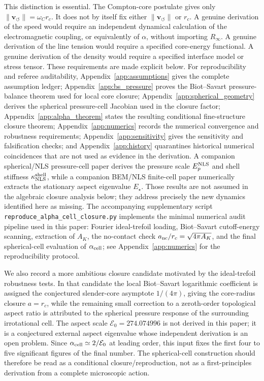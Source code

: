 \documentclass[aps,pra,preprint,longbibliography,nofootinbib]{revtex4-2}
\newcommand{\Et}{\mathcal{E}_0}                    %
\begin{document}
This distinction is essential.  The Compton-core postulate gives only
$\lVert \mathbf{v}_{\!\boldsymbol{\circlearrowleft}}\rVert=\omega_C r_c$.
It does not by itself fix either
$\lVert \mathbf{v}_{\!\boldsymbol{\circlearrowleft}}\rVert$ or $r_c$.
A genuine derivation of the speed would require an independent dynamical
calculation of the electromagnetic coupling, or equivalently of
$\alpha$, without importing $R_\infty$.  A genuine derivation of the line
tension would require a specified core-energy functional.  A genuine
derivation of the density would require a specified interface model or
stress tensor.  These requirements are made explicit below.  For reproducibility and
referee auditability, Appendix~\ref{app:assumptions} gives the complete
assumption ledger; Appendix~\ref{app:bs_pressure} proves the Biot--Savart
pressure-balance theorem used for local core closure;
Appendix~\ref{app:spherical_geometry} derives the spherical pressure-cell
Jacobian used in the closure factor; Appendix~\ref{app:alpha_theorem}
states the resulting conditional fine-structure closure theorem;
Appendix~\ref{app:numerics} records the numerical convergence and
robustness requirements; Appendix~\ref{app:sensitivity} gives the
sensitivity and falsification checks; and Appendix~\ref{app:history}
quarantines historical numerical coincidences that are not used as
evidence in the derivation.  A companion spherical/NLS pressure-cell paper
derives the pressure scale \(E_p^{\rm NLS}\) and shell stiffness
\(\kappa_{\rm NLS}^{\rm shell}\), while a companion BEM/NLS finite-cell
paper numerically extracts the stationary aspect eigenvalue \(E_\star\).
Those results are not assumed in the algebraic closure analysis below; they
address precisely the new dynamics identified here as missing.  The accompanying
supplementary script
\texttt{reproduce\_alpha\_cell\_closure.py} implements the minimal numerical
audit pipeline used in this paper: Fourier ideal-trefoil loading,
Biot--Savart cutoff-energy scanning, extraction of $A_K$, the
no-contact check $a_{\rm nc}/r_c=\sqrt{4\pi A_K}$, and the final
spherical-cell evaluation of $\alpha_{\rm cell}$; see
Appendix~\ref{app:numerics} for the reproducibility protocol.


We also record a more ambitious closure candidate motivated by the
ideal-trefoil robustness tests.  In that candidate the local Biot--Savart
logarithmic coefficient is assigned the conjectured slender-core asymptote
$1/(4\pi)$, giving the core-radius closure $a=r_c$, while the remaining
small correction to a zeroth-order topological aspect ratio is attributed
to the spherical pressure response of the surrounding irrotational cell.
The aspect scale $\Et=274.074996$ is not derived in this paper; it is a
conjectured external aspect eigenvalue whose independent derivation is an
open problem.  Since $\alpha_{\rm cell}\simeq2/\Et$ at leading order,
this input fixes the first four to five significant figures of the final
number.  The spherical-cell construction should therefore be read as a
conditional closure/reproduction, not as a first-principles derivation from
a complete microscopic action.
\end{document}
